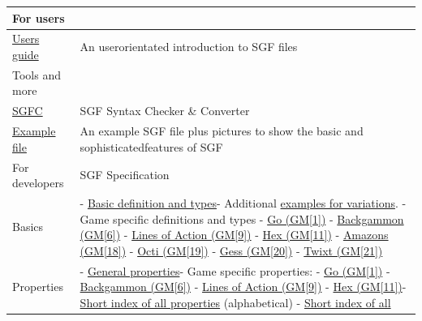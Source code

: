 {\def\LTcaptype{none} %
\begin{longtable}[]{@{}
  >{\raggedright\arraybackslash}p{}
  >{\raggedright\arraybackslash}p{}@{}}
\toprule\noalign{}
\begin{minipage}[b]{\linewidth}\raggedright
For users
\end{minipage} & \begin{minipage}[b]{\linewidth}\raggedright
\end{minipage} \\
\midrule\noalign{}
\endhead
\bottomrule\noalign{}
\endlastfoot
\href{https://red-bean.com/sgf/user_guide/index.html}{Users guide} & An
userorientated introduction to SGF files \\
Tools and more & \\
\href{https://red-bean.com/sgf/sgfc/index.html}{SGFC} & SGF Syntax
Checker \& Converter \\
\href{https://red-bean.com/sgf/examples/}{Example file} & An example SGF
file plus pictures to show the basic and sophisticatedfeatures of SGF \\
For developers & SGF Specification \\
Basics & - \href{https://red-bean.com/sgf/sgf4.html}{Basic definition
and types}- Additional \href{https://red-bean.com/sgf/var.html}{examples
for variations}. - Game specific definitions and types -
\href{https://red-bean.com/sgf/go.html}{Go (GM{[}1{]})} -
\href{https://red-bean.com/sgf/backgammon.html}{Backgammon (GM{[}6{]})}
- \href{https://red-bean.com/sgf/loa.html}{Lines of Action (GM{[}9{]})}
- \href{https://red-bean.com/sgf/hex.html}{Hex (GM{[}11{]})} -
\href{https://red-bean.com/sgf/amazons.html}{Amazons (GM{[}18{]})} -
\href{https://red-bean.com/sgf/octi.html}{Octi (GM{[}19{]})} -
\href{https://red-bean.com/sgf/gess.html}{Gess (GM{[}20{]})} -
\href{https://red-bean.com/sgf/twixt.html}{Twixt (GM{[}21{]})} \\
Properties & - \href{https://red-bean.com/sgf/properties.html}{General
properties}- Game specific properties: -
\href{https://red-bean.com/sgf/go.html\#properties}{Go (GM{[}1{]})} -
\href{https://red-bean.com/sgf/backgammon.html\#properties}{Backgammon
(GM{[}6{]})} -
\href{https://red-bean.com/sgf/loa.html\#properties}{Lines of Action
(GM{[}9{]})} - \href{https://red-bean.com/sgf/hex.html\#properties}{Hex
(GM{[}11{]})}- \href{https://red-bean.com/sgf/proplist.html}{Short index
of all properties} (alphabetical) -
\href{https://red-bean.com/sgf/proplist_t.html}{Short index of all
}
\end{longtable}}
